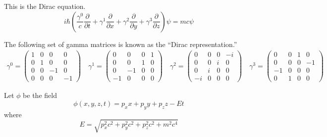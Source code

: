 \documentclass[12pt]{article}
\begin{document}
\noindent
This is the Dirac equation.
\begin{equation*}
i\hbar\left(
\frac{\gamma^0}{c}\frac{\partial}{\partial t}+
\gamma^1\frac{\partial}{\partial x}+
\gamma^2\frac{\partial}{\partial y}+
\gamma^3\frac{\partial}{\partial z}
\right)\psi
=mc\psi
\end{equation*}

\noindent
The following set of gamma matrices is known as the ``Dirac representation.''
{\small
\begin{gather*}
\gamma^0=\begin{pmatrix}1&0&0&0\\0&1&0&0\\0&0&-1&0\\0&0&0&-1\end{pmatrix}\quad
\gamma^1=\begin{pmatrix}0&0&0&1\\0&0&1&0\\0&-1&0&0\\-1&0&0&0\end{pmatrix}\quad
\gamma^2=\begin{pmatrix}0&0&0&-i\\0&0&i&0\\0&i&0&0\\-i&0&0&0\end{pmatrix}\quad
\gamma^3=\begin{pmatrix}0&0&1&0\\0&0&0&-1\\-1&0&0&0\\0&1&0&0\end{pmatrix}
\end{gather*}
}

\noindent
Let $\phi$ be the field
\begin{equation*}
\phi(x,y,z,t)=p_xx+p_yy+p_zz-Et
\end{equation*}
where
\begin{equation*}
E=\sqrt{p_x^2c^2+p_y^2c^2+p_z^2c^2+m^2c^4}
\end{equation*}
\end{document}
